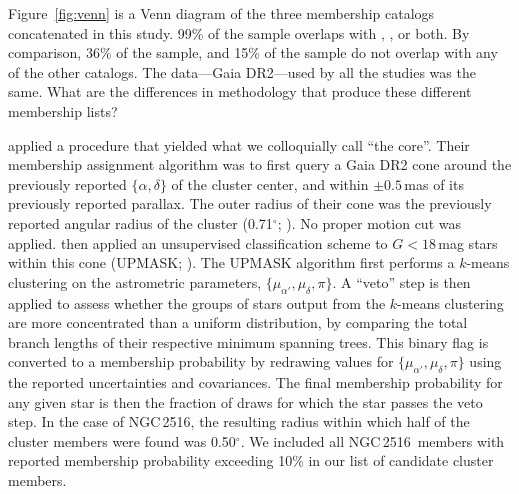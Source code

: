 \documentclass[12pt,twocolumn,tighten]{aastex63}
\newcommand{\cn}{NGC\,2516} %
\begin{document}
Figure~\ref{fig:venn} is a Venn diagram of
the three membership catalogs concatenated in this study.  99\% of the
 sample overlaps with
, , or
both.  By comparison, 36\% of the 
sample, and 15\% of the  sample do not
overlap with any of the other catalogs.  The data---Gaia DR2---used by
all the studies was the same.  What are the differences in methodology
that produce these different membership lists?

 applied a procedure that yielded
what we colloquially call ``the core''.  Their membership assignment
algorithm was to first query a Gaia DR2 cone around the previously
reported $\{\alpha,\delta\}$ of the cluster center, and within $\pm
0.5$\,mas of its previously reported parallax.  The outer radius of
their cone was the previously reported angular radius of the cluster
(0.71$^\circ$; \citealt{Kharchenko_et_al_2013}).  No proper motion cut
was applied.   then applied an
unsupervised classification scheme to $G<18$\,mag stars within this
cone (UPMASK; \citealt{kronemartins_upmask_2014}).  The UPMASK
algorithm first performs a $k$-means clustering on the astrometric
parameters, $\{\mu_{\alpha'}, \mu_\delta, \pi\}$.  A ``veto''
step is then applied to assess whether the groups of stars output from the
$k$-means clustering are more concentrated than a uniform
distribution, by comparing the total branch lengths of their
respective minimum spanning trees.  This binary flag is converted to a
membership probability by redrawing values for $\{\mu_{\alpha'},
\mu_\delta, \pi\}$ using the reported uncertainties and
covariances.  The final membership probability for any given star is
then the fraction of draws for which the star passes the veto step.
In the case of \cn, the resulting radius within which half of the
cluster members were found was 0.50$^\circ$.  We included all
 \cn\ members with reported
membership probability exceeding 10\% in our list of candidate cluster
members.
\end{document}
